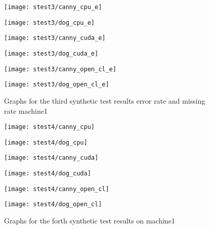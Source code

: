 \begin{figure}[H]
\centering
\begin{minipage}[t]{.49\textwidth}
\centering
\texttt{[image: stest3/canny\_cpu\_e]}
\end{minipage}
\begin{minipage}[t]{.49\textwidth}
\centering
\texttt{[image: stest3/dog\_cpu\_e]}
\end{minipage}
\begin{minipage}[t]{.49\textwidth}
\centering
\texttt{[image: stest3/canny\_cuda\_e]}
\end{minipage}
\begin{minipage}[t]{.49\textwidth}
\centering
\texttt{[image: stest3/dog\_cuda\_e]}
\end{minipage}
\begin{minipage}[t]{.49\textwidth}
\centering
\texttt{[image: stest3/canny\_open\_cl\_e]}
\end{minipage}
\begin{minipage}[t]{.49\textwidth}
\centering
\texttt{[image: stest3/dog\_open\_cl\_e]}
\end{minipage}
\caption{Graphs for the third synthetic test results error rate and missing rate machine1}
\label{fig:test3se}
\end{figure}

\begin{figure}[H]
\centering
\begin{minipage}[t]{.49\textwidth}
\centering
\texttt{[image: stest4/canny\_cpu]}
\end{minipage}
\begin{minipage}[t]{.49\textwidth}
\centering
\texttt{[image: stest4/dog\_cpu]}
\end{minipage}
\begin{minipage}[t]{.49\textwidth}
\centering
\texttt{[image: stest4/canny\_cuda]}
\end{minipage}
\begin{minipage}[t]{.49\textwidth}
\centering
\texttt{[image: stest4/dog\_cuda]}
\end{minipage}
\begin{minipage}[t]{.49\textwidth}
\centering
\texttt{[image: stest4/canny\_open\_cl]}
\end{minipage}
\begin{minipage}[t]{.49\textwidth}
\centering
\texttt{[image: stest4/dog\_open\_cl]}
\end{minipage}
\caption{Graphs for the forth synthetic test results on machine1}
\label{fig:test4s}
\end{figure}

